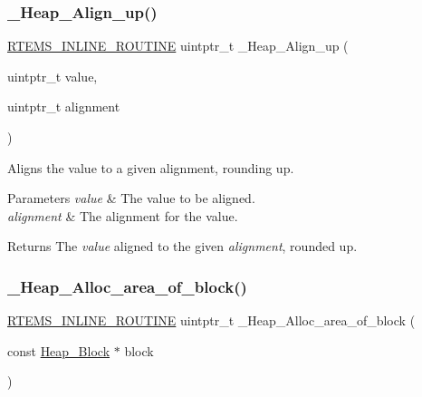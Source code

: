 \subsubsection{\texorpdfstring{\_Heap\_Align\_up()}{\_Heap\_Align\_up()}}
{\footnotesize\ttfamily \mbox{\hyperlink{group__RTEMSScoreBaseDefs_gac216239df231d5dbd15e3520b0b9313f}{R\+T\+E\+M\+S\+\_\+\+I\+N\+L\+I\+N\+E\+\_\+\+R\+O\+U\+T\+I\+NE}} uintptr\+\_\+t \+\_\+\+Heap\+\_\+\+Align\+\_\+up (\begin{DoxyParamCaption}\item[{uintptr\+\_\+t}]{value,  }\item[{uintptr\+\_\+t}]{alignment }\end{DoxyParamCaption})}



Aligns the value to a given alignment, rounding up. 


\begin{DoxyParams}{Parameters}
{\em value} & The value to be aligned. \\
\hline
{\em alignment} & The alignment for the value.\\
\hline
\end{DoxyParams}
\begin{DoxyReturn}{Returns}
The {\itshape value} aligned to the given {\itshape alignment}, rounded up. 
\end{DoxyReturn}
\mbox{\label{group__RTEMSScoreHeap_ga2563e03746d89148a8782b02f6159821}} 
\subsubsection{\texorpdfstring{\_Heap\_Alloc\_area\_of\_block()}{\_Heap\_Alloc\_area\_of\_block()}}
{\footnotesize\ttfamily \mbox{\hyperlink{group__RTEMSScoreBaseDefs_gac216239df231d5dbd15e3520b0b9313f}{R\+T\+E\+M\+S\+\_\+\+I\+N\+L\+I\+N\+E\+\_\+\+R\+O\+U\+T\+I\+NE}} uintptr\+\_\+t \+\_\+\+Heap\+\_\+\+Alloc\+\_\+area\+\_\+of\+\_\+block (\begin{DoxyParamCaption}\item[{const \mbox{\hyperlink{structHeap__Block}{Heap\+\_\+\+Block}} $\ast$}]{block }\end{DoxyParamCaption})}



